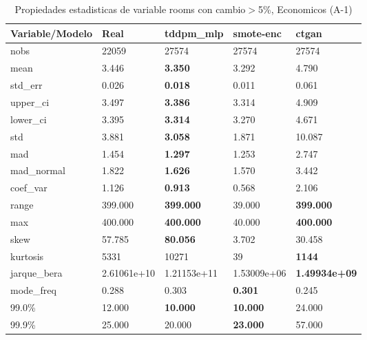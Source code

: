 \begin{table}[H]
\centering
\fontsize{8}{14}\selectfont
\caption{Propiedades estadisticas de variable rooms con cambio\ensuremath{>}5\%, Economicos (A-1)}
\label{table-stats-economicos-a-1-rooms-short}
\begin{tabular}{|l|m{10em}|m{10em}|m{10em}|m{10em}|}
\hline
 \rowcolor[gray]{0.8}
Variable/Modelo & Real & tddpm\_mlp & smote-enc & ctgan \\
\hline nobs & 22059 & 27574 & 27574 & 27574 \\
\hline mean & 3.446 & \bfseries 3.350 & 3.292 & \cellcolor[rgb]{0.9, 0.54, 0.52} 4.790 \\
\hline std\_err & 0.026 & \bfseries 0.018 & 0.011 & \cellcolor[rgb]{0.9, 0.54, 0.52} 0.061 \\
\hline upper\_ci & 3.497 & \bfseries 3.386 & 3.314 & \cellcolor[rgb]{0.9, 0.54, 0.52} 4.909 \\
\hline lower\_ci & 3.395 & \bfseries 3.314 & 3.270 & \cellcolor[rgb]{0.9, 0.54, 0.52} 4.671 \\
\hline std & 3.881 & \bfseries 3.058 & 1.871 & \cellcolor[rgb]{0.9, 0.54, 0.52} 10.087 \\
\hline mad & 1.454 & \bfseries 1.297 & 1.253 & \cellcolor[rgb]{0.9, 0.54, 0.52} 2.747 \\
\hline mad\_normal & 1.822 & \bfseries 1.626 & 1.570 & \cellcolor[rgb]{0.9, 0.54, 0.52} 3.442 \\
\hline coef\_var & 1.126 & \bfseries 0.913 & 0.568 & \cellcolor[rgb]{0.9, 0.54, 0.52} 2.106 \\
\hline range & 399.000 & \bfseries 399.000 & \cellcolor[rgb]{0.9, 0.54, 0.52} 39.000 & \bfseries 399.000 \\
\hline max & 400.000 & \bfseries 400.000 & \cellcolor[rgb]{0.9, 0.54, 0.52} 40.000 & \bfseries 400.000 \\
\hline skew & 57.785 & \bfseries 80.056 & \cellcolor[rgb]{0.9, 0.54, 0.52} 3.702 & 30.458 \\
\hline kurtosis & 5331 & 10271 & \cellcolor[rgb]{0.9, 0.54, 0.52} 39 & \bfseries 1144 \\
\hline jarque\_bera & 2.61061e+10 & \cellcolor[rgb]{0.9, 0.54, 0.52} 1.21153e+11 & 1.53009e+06 & \bfseries 1.49934e+09 \\
\hline mode\_freq & 0.288 & 0.303 & \bfseries 0.301 & \cellcolor[rgb]{0.9, 0.54, 0.52} 0.245 \\
\hline 99.0\% & 12.000 & \bfseries 10.000 & \bfseries 10.000 & \cellcolor[rgb]{0.9, 0.54, 0.52} 24.000 \\
\hline 99.9\% & 25.000 & 20.000 & \bfseries 23.000 & \cellcolor[rgb]{0.9, 0.54, 0.52} 57.000 \\
\hline
\end{tabular}
\end{table}
